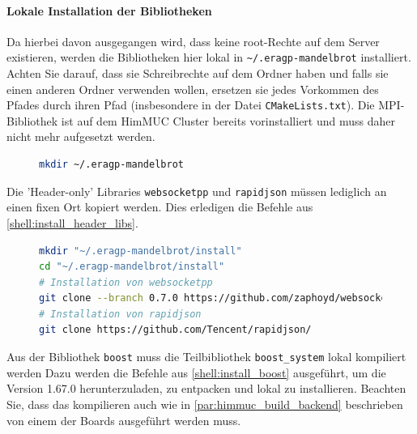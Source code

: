 \paragraph{Lokale Installation der Bibliotheken}\label{par:himmuc_install_libs}


Da hierbei davon ausgegangen wird, dass keine root-Rechte auf dem
Server existieren, werden die Bibliotheken hier lokal in \verb|~/.eragp-mandelbrot|
installiert.
Achten Sie darauf, dass sie Schreibrechte auf dem Ordner haben und
falls sie einen anderen Ordner verwenden wollen,
ersetzen sie jedes Vorkommen des Pfades durch ihren Pfad (insbesondere in der Datei \verb|CMakeLists.txt|).
Die MPI-Bibliothek ist auf dem HimMUC Cluster bereits vorinstalliert
und muss daher nicht mehr aufgesetzt werden.
\begin{figure}[h!]
	\begin{lstlisting}[language=bash, caption={Erstellen des Installationsordners}]
mkdir ~/.eragp-mandelbrot
    \end{lstlisting}
\end{figure}

Die 'Header-only' Libraries \verb|websocketpp| und \verb|rapidjson| müssen
lediglich an einen fixen Ort kopiert werden.
Dies erledigen die Befehle aus \autoref{shell:install_header_libs}.

\begin{figure}[h!]
	\begin{lstlisting}[language=bash, caption={Lokale Installation der Bibliotheken \texttt{websocketpp} und \texttt{rapidjson}.}, label={shell:install_header_libs}]
mkdir "~/.eragp-mandelbrot/install"
cd "~/.eragp-mandelbrot/install"
# Installation von websocketpp
git clone --branch 0.7.0 https://github.com/zaphoyd/websocketpp.git websocketpp --depth 1
# Installation von rapidjson
git clone https://github.com/Tencent/rapidjson/
    \end{lstlisting}
\end{figure}


Aus der Bibliothek \verb|boost| muss die Teilbibliothek \verb|boost_system| lokal kompiliert werden
Dazu werden die Befehle aus \autoref{shell:install_boost} ausgeführt,
um die Version 1.67.0 herunterzuladen, zu entpacken und lokal zu installieren.
Beachten Sie, dass das kompilieren auch wie in \autoref{par:himmuc_build_backend} beschrieben
von einem der Boards ausgeführt werden muss.

